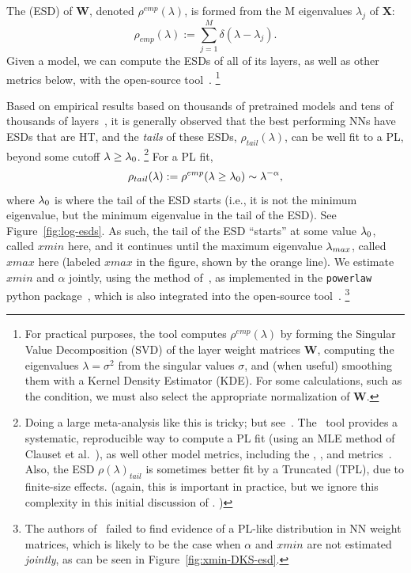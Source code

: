 \noindent
The \EmpiricalSpectralDensity (ESD) of $\mathbf{W}$, denoted $\rho^{emp}(\lambda)$, is formed from the M eigenvalues $\lambda_{j}$ of $\mathbf{X}$:
\begin{equation}
\rho_{emp}(\lambda):=\sum_{j=1}^{M}\delta(\lambda-\lambda_{j}) .
\label{eqn:rho}
\end{equation}
Given a model, we can compute the ESDs of all of its layers, as well as other metrics below,
with the open-source \WW tool~\cite{WW}.%
\footnote{For practical purposes, the \WW tool computes $\rho^{emp}(\lambda)$ by forming the Singular Value Decomposition (SVD) of the layer weight matrices $\mathbf{W}$, computing the eigenvalues $\lambda=\sigma^{2}$ from the singular values $\sigma$, and (when useful) smoothing them with a Kernel Density Estimator (KDE). For some calculations, such as the \TRACELOG condition, we must also select the appropriate normalization of $\mathbf{W}$.}


Based on empirical results based on thousands of pretrained models and tens of thousands of layers~\cite{MM18_TR_JMLRversion,MM20a_trends_NatComm,MM21a_simpsons_TR,YTHx23_KDD}, 
it is generally observed that the 
best performing NNs have ESDs that are HT, and the \emph{tails} of these ESDs, $\rho_{tail}(\lambda)$, can be well fit to a PL, beyond some cutoff $\lambda\ge\lambda_{0}$.%
\footnote{Doing a large meta-analysis like this is tricky; but see~\cite{MM18_TR_JMLRversion,MM20a_trends_NatComm,MM21a_simpsons_TR,YTHx23_KDD}.  The \WW~tool provides a systematic, reproducible way to compute a PL fit (using an MLE method of Clauset et al.~\cite{CSN09_powerlaw}), as well other model metrics, including the \SPECTRALNORM, \RANDDIST, and \ALPHAHAT metrics~\cite{MM20a_trends_NatComm}.  Also, the ESD $\rho(\lambda)_{tail}$ is sometimes better fit by a Truncated \PowerLaw (TPL), due to finite-size effects.
(again, this is important in practice, but we ignore this complexity in this initial discussion of \SETOL. ) }
For a PL fit,
\begin{equation}
\rho_{tail}(\lambda):=\rho^{emp}(\lambda\ge\lambda_{0})\sim\lambda^{-\alpha} ,
\label{eqn:rho_tail}
\end{equation}
where $\lambda_{0}$ is where the tail of the ESD starts (i.e., it is not the minimum eigenvalue, but the minimum eigenvalue in the tail of the ESD). 
See Figure~\ref{fig:log-esds}.
As such, the tail of the ESD ``starts'' at some value $\lambda_{0}$, called $xmin$ here, and it continues until the 
maximum eigenvalue $\lambda_{max}$, called $xmax$ here
(labeled $xmax$ in the figure, shown by the orange line).
We estimate $xmin$ and $\alpha$ jointly, using the method of~\cite{CSN09_powerlaw}, 
as implemented in the \texttt{powerlaw} python package~\cite{ABP14}, 
which is also integrated into the open-source \WW tool~\cite{MM20a_trends_NatComm, WW}.%
\footnote{The authors of~\cite{Thamm2022} failed to find evidence of a PL-like distribution in NN weight matrices, which is 
likely to be the case when $\alpha$ and $xmin$ are not estimated \emph{jointly}, as can be seen in Figure~\ref{fig:xmin-DKS-esd}.  }



